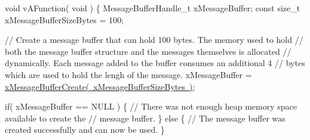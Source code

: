 \begin{DoxyPre}void vAFunction( void )
\{
MessageBufferHandle\_t xMessageBuffer;
const size\_t xMessageBufferSizeBytes = 100;\end{DoxyPre}



\begin{DoxyPre}    // Create a message buffer that can hold 100 bytes.  The memory used to hold
    // both the message buffer structure and the messages themselves is allocated
    // dynamically.  Each message added to the buffer consumes an additional 4
    // bytes which are used to hold the lengh of the message.
    xMessageBuffer = \mbox{\hyperlink{message__buffer_8h_a2959cd0e3d2bd20d46908e5c9872be36}{xMessageBufferCreate( xMessageBufferSizeBytes )}};\end{DoxyPre}



\begin{DoxyPre}    if( xMessageBuffer == NULL )
    \{
        // There was not enough heap memory space available to create the
        // message buffer.
    \}
    else
    \{
        // The message buffer was created successfully and can now be used.
    \}\end{DoxyPre}



\begin{DoxyPre}\end{DoxyPre}
 
